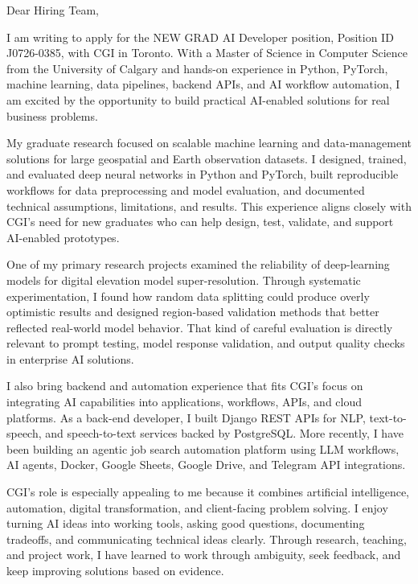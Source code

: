 \documentclass[11pt]{letter}
\begin{document}
\begin{letter}{}

\opening{Dear Hiring Team,}

I am writing to apply for the NEW GRAD AI Developer position, Position ID J0726-0385, with CGI in Toronto. With a Master of Science in Computer Science from the University of Calgary and hands-on experience in Python, PyTorch, machine learning, data pipelines, backend APIs, and AI workflow automation, I am excited by the opportunity to build practical AI-enabled solutions for real business problems.

My graduate research focused on scalable machine learning and data-management solutions for large geospatial and Earth observation datasets. I designed, trained, and evaluated deep neural networks in Python and PyTorch, built reproducible workflows for data preprocessing and model evaluation, and documented technical assumptions, limitations, and results. This experience aligns closely with CGI's need for new graduates who can help design, test, validate, and support AI-enabled prototypes.

One of my primary research projects examined the reliability of deep-learning models for digital elevation model super-resolution. Through systematic experimentation, I found how random data splitting could produce overly optimistic results and designed region-based validation methods that better reflected real-world model behavior. That kind of careful evaluation is directly relevant to prompt testing, model response validation, and output quality checks in enterprise AI solutions.

I also bring backend and automation experience that fits CGI's focus on integrating AI capabilities into applications, workflows, APIs, and cloud platforms. As a back-end developer, I built Django REST APIs for NLP, text-to-speech, and speech-to-text services backed by PostgreSQL. More recently, I have been building an agentic job search automation platform using LLM workflows, AI agents, Docker, Google Sheets, Google Drive, and Telegram API integrations.

CGI's role is especially appealing to me because it combines artificial intelligence, automation, digital transformation, and client-facing problem solving. I enjoy turning AI ideas into working tools, asking good questions, documenting tradeoffs, and communicating technical ideas clearly. Through research, teaching, and project work, I have learned to work through ambiguity, seek feedback, and keep improving solutions based on evidence.


\end{letter}
\end{document}
